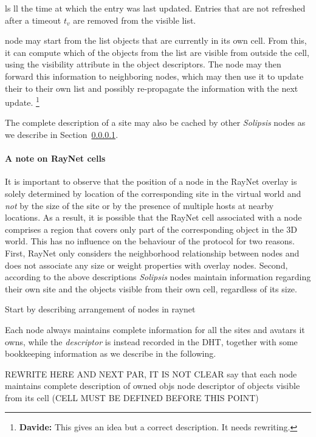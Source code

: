 \documentclass{article}
\newcommand{\df}[1]{\footnote{\textbf{Davide: }#1}}
\newcommand{\sol}{\emph{Solipsis}\xspace}
\begin{document}
ls
ll
 the time at
which the entry was last updated. Entries that are not refreshed after
a timeout $t_v$ are removed from the visible list.




node may start from the list objects that are currently in its own
cell. From this, it can compute which of the objects from the list are
visible from outside the cell, using the visibility attribute in the
object descriptors. The node may then forward this information to
neighboring nodes, which may then use it to update their to their own
list and possibly re-propagate the information with the next
update. \df{This gives an idea but a correct description. It needs
  rewriting.}


The complete description of a site may also be cached by other \sol
nodes as we describe in Section~\ref{}. 





\paragraph{A note on RayNet cells}
It is important to observe that the position of a node in the RayNet
overlay is solely determined by location of the corresponding site in
the virtual world and \emph{not} by the size of the site or by the
presence of multiple hosts at nearby locations.  As a result, it is
possible that the RayNet cell associated with a node comprises a region
that covers only part of the corresponding object in the 3D
world. This has no influence on the behaviour of the protocol for two
reasons. First, RayNet only considers the neighborhood relationship
between nodes and does not associate any size or weight properties
with overlay nodes. Second, according to the above descriptions \sol
nodes maintain information regarding their own site and the objects
visible from their own cell, regardless of its size.


 Start by describing arrangement of nodes in raynet


Each node always maintains complete information for all
the sites and avatars it owns, while the \emph{descriptor} is instead
recorded in the DHT, together with some bookkeeping information as we
describe in the following.

REWRITE HERE AND NEXT PAR, IT IS NOT CLEAR 
say that each node maintains
complete description of owned objs
node descriptor of objects visible from its cell (CELL MUST BE DEFINED
BEFORE THIS POINT)
\end{document}
